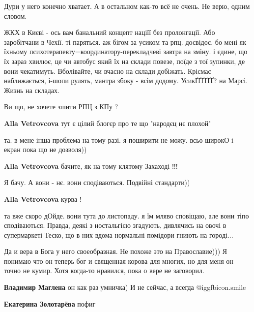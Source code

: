 \begin{itemize}
Дури у него конечно хватает. А в остальном как-то всё не очень. Не верю, одним словом.


ЖКХ в Києві - ось вам банальний концепт націїї без пролонгації. Або заробітчани
в Чехії. ті паряться. аж бігом за усиком та рпц. досвідос. бо мені як їхньому
психотерапевту=координатору-перекладчеві завтра на зміну. і єдине, що їх зараз
хвилює, це чи автобус який їх на склади повезе, поїде з тої зупинки, де вони
чекатимуть. Вболівайте, чи вчасно на склади добіжать. Крісмас наближається,
і-шопи рулять, мантра збоку - всім додому. УсикҐҐҐҐҐҐ? на Марсі. Жизнь на
складах.

\begin{itemize} %
Ви що, не хочете зшити РПЦ з КПу ?

\textbf{Alla Vetrovcova} тут є цілий блогєр про те що "народєц нє плохой"

та. в мене інша проблема на тому разі. я поширити не можу. всьо широкО і екран пока що не дозволя))

\textbf{Alla Vetrovcova} бачите, як на тому клятому Захаході !!!

Я бачу. А вони - нє. вони сподіваються. Подвійні стандарти))

\textbf{Alla Vetrovcova} курва !

та вже скоро дОйде. вони тута до листопаду. я їм мляво сповіщаю, але вони тіпо
сподіваються. Правда, деякі з ностальгією згадують, дивлячись на овочі в
супермаркеті Теско, що в них вдома нормальні помідори гниють на городі...
\end{itemize} %


Да и вера в Бога у него своеобразная. Не похоже это на Православие))) Я понимаю
что он теперь бог и священная корова для многих, но для меня он точно не кумир.
Хотя когда-то нравился, пока о вере не заговорил.

\begin{itemize} %

\textbf{Владимир Маглена} он как раз умничка) И не сейчас, а всегда  @igg{fbicon.smile} 

\textbf{Екатерина Золотарёва} пофиг



\end{itemize}
\end{itemize}
